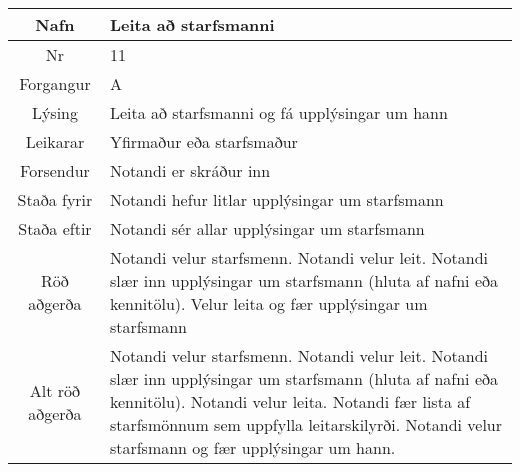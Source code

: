 \documentclass[a4paper]{article}
\begin{document}
\begin{tabular}{|c|p{10cm}|}
\hline
Nafn&Leita að starfsmanni \\
\hline
Nr&11\\
\hline
Forgangur&A\\
\hline
Lýsing&Leita að starfsmanni og fá upplýsingar um hann\\
\hline
Leikarar&Yfirmaður eða starfsmaður\\
\hline
Forsendur&Notandi er skráður inn\\
\hline
Staða fyrir&Notandi hefur litlar upplýsingar um starfsmann\\
\hline
Staða eftir&Notandi sér allar upplýsingar um starfsmann\\
\hline
Röð aðgerða&Notandi velur starfsmenn. Notandi velur leit. Notandi slær inn upplýsingar um starfsmann (hluta af nafni eða kennitölu). Velur leita og fær upplýsingar um starfsmann\\
\hline
Alt röð aðgerða&Notandi velur starfsmenn. Notandi velur leit. Notandi slær inn upplýsingar um starfsmann (hluta af nafni eða kennitölu). Notandi velur leita. Notandi fær lista af starfsmönnum sem uppfylla leitarskilyrði. Notandi velur starfsmann og fær upplýsingar um hann.\\
\hline
\end{tabular}
\end{document}
